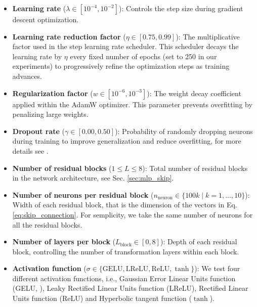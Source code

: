 \documentclass{article}
\theoremstyle{plain}
\numberwithin{equation}{section}
\begin{document}
\begin{itemize}
    \item \textbf{Learning rate} ($\lambda \in [10^{-4}, 10^{-2}]$): Controls the step size during gradient descent optimization.

    \item \textbf{Learning rate reduction factor} ($\eta \in [0.75, 0.99]$): The multiplicative factor used in the step learning rate scheduler. This scheduler decays the learning rate by $\eta$ every fixed number of epochs (set to 250 in our experiments) to progressively refine the optimization steps as training advances.

    \item \textbf{Regularization factor} ($w \in [10^{-6}, 10^{-3}]$): The weight decay coefficient applied within the AdamW optimizer. This parameter prevents overfitting by penalizing large weights.

    \item \textbf{Dropout rate} ($\gamma \in [0.00, 0.50]$): Probability of randomly dropping neurons during training to improve generalization and reduce overfitting, for more details see \cite{srivastava2014dropout}.

    \item \textbf{Number of residual blocks} ($1 \le L \le 8$): Total number of residual blocks in the network architecture, see Sec. \ref{sec:mlp_skip}.

    \item \textbf{Number of neurons per residual block} ($n_{\text{neuron}} \in \{100k \mid k = 1, \ldots, 10\}$): Width of each residual block, that is the dimension of the vectors in Eq. \eqref{eq:skip_connection}. For semplicity, we take the same number of neurons for all the residual blocks.

    \item \textbf{Number of layers per block} ($L_{\text{block}} \in [0, 8]$): Depth of each residual block, controlling the number of transformation layers within each block.

    \item \textbf{Activation function} ($\sigma \in \{\text{GELU}, \text{LReLU}, \text{ReLU}, \tanh\}$): We test four different activation functions, i.e., Gaussian Error Linear Units function (GELU, \cite{hendrycks2016gaussian}), Leaky Rectified Linear Units function (LReLU), Rectified Linear Units function (ReLU) and Hyperbolic tangent function ($\tanh$).
\end{itemize}
\end{document}

